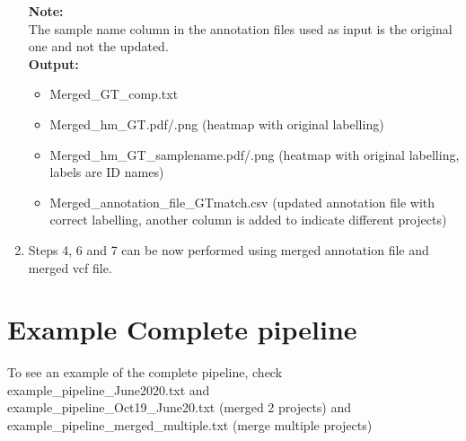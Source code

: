 \documentclass[11pt]{paper}
\begin{document}
\begin{enumerate}
\begin{itemize}
\end{itemize}
\textbf{Note:}\\
The sample name column in the annotation files used as input is the original one and not the updated.\\
\textbf{Output:}
\begin{itemize}
\item Merged\_GT\_comp.txt
\item Merged\_hm\_GT.pdf/.png (heatmap with original labelling)
\item Merged\_hm\_GT\_samplename.pdf/.png (heatmap with original labelling, labels are ID names)
\item Merged\_annotation\_file\_GTmatch.csv (updated annotation file with correct labelling, another column is added to indicate different projects)
\end{itemize}
\item Steps 4, 6 and 7 can be now performed using merged annotation file and merged vcf file.
\end{enumerate}


\section{Example Complete pipeline}
To see an example of the complete pipeline, check example\_pipeline\_June2020.txt and\\ 
example\_pipeline\_Oct19\_June20.txt (merged 2 projects) and example\_pipeline\_merged\_multiple.txt (merge multiple projects)
\end{document}

